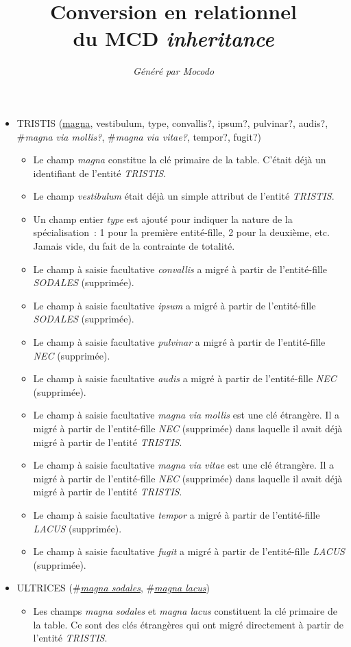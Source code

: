 \documentclass[a4paper]{article}
\title{Conversion en relationnel\\du MCD \emph{inheritance}}
\author{\emph{Généré par Mocodo}}
\newcommand{\relat}[1]{\textsc{#1}}
\newcommand{\attr}[1]{#1}
\newcommand{\prim}[1]{\uline{#1}}
\newcommand{\foreign}[1]{\#\textsl{#1}}
\begin{document}
\maketitle

\begin{itemize}
  \item \relat{TRISTIS} (\prim{magna}, \attr{vestibulum}, \attr{type}, \attr{convallis?}, \attr{ipsum?}, \attr{pulvinar?}, \attr{audis?}, \foreign{magna via mollis?}, \foreign{magna via vitae?}, \attr{tempor?}, \attr{fugit?})
  \begin{itemize}
    \item Le champ \emph{magna} constitue la clé primaire de la table. C'était déjà un identifiant de l'entité \emph{TRISTIS}.
    \item Le champ \emph{vestibulum} était déjà un simple attribut de l'entité \emph{TRISTIS}.
    \item Un champ entier \emph{type} est ajouté pour indiquer la nature de la spécialisation : 1 pour la première entité-fille, 2 pour la deuxième, etc. Jamais vide, du fait de la contrainte de totalité.
    \item Le champ à saisie facultative \emph{convallis} a migré à partir de l'entité-fille \emph{SODALES} (supprimée).
    \item Le champ à saisie facultative \emph{ipsum} a migré à partir de l'entité-fille \emph{SODALES} (supprimée).
    \item Le champ à saisie facultative \emph{pulvinar} a migré à partir de l'entité-fille \emph{NEC} (supprimée).
    \item Le champ à saisie facultative \emph{audis} a migré à partir de l'entité-fille \emph{NEC} (supprimée).
    \item Le champ à saisie facultative \emph{magna via mollis} est une clé étrangère. Il a migré à partir de l'entité-fille \emph{NEC} (supprimée) dans laquelle il avait déjà migré à partir de l'entité \emph{TRISTIS}.
    \item Le champ à saisie facultative \emph{magna via vitae} est une clé étrangère. Il a migré à partir de l'entité-fille \emph{NEC} (supprimée) dans laquelle il avait déjà migré à partir de l'entité \emph{TRISTIS}.
    \item Le champ à saisie facultative \emph{tempor} a migré à partir de l'entité-fille \emph{LACUS} (supprimée).
    \item Le champ à saisie facultative \emph{fugit} a migré à partir de l'entité-fille \emph{LACUS} (supprimée).
  \end{itemize}

  \item \relat{ULTRICES} (\foreign{\prim{magna sodales}}, \foreign{\prim{magna lacus}})
  \begin{itemize}
    \item Les champs \emph{magna sodales} et \emph{magna lacus} constituent la clé primaire de la table. Ce sont des clés étrangères qui ont migré directement à partir de l'entité \emph{TRISTIS}.
  \end{itemize}

\end{itemize}
\end{document}
